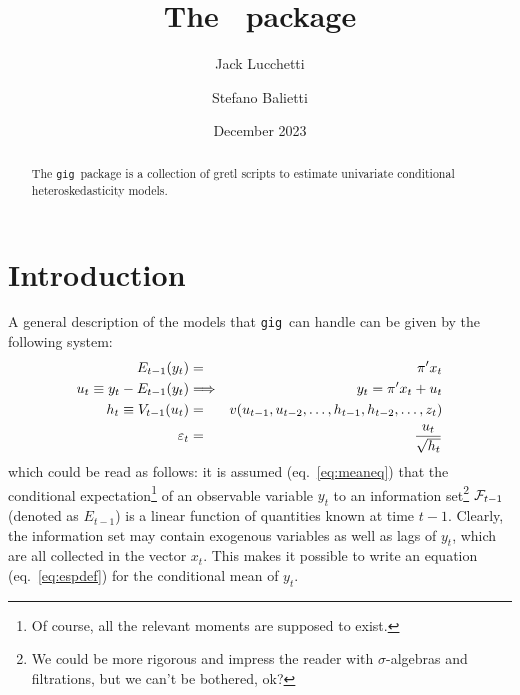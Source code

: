 \documentclass[a4paper,11pt]{article}
\title{The \gig\ package}
\author{Jack Lucchetti \and Stefano Balietti}
\date{December 2023}
\newcommand{\app}[1]{\textsf{#1}}
\newcounter{script}[section]
\newcommand{\stdu}{\ensuremath \varepsilon}
\newcommand{\uhat}{\ensuremath u}
\newcommand{\InfSet}[1]{\ensuremath \mathcal{F}_{#1}}
\newcommand{\gig}{\texttt{gig}}
\begin{document}
\maketitle

\begin{abstract}
The \gig\ package is a collection of \app{gretl} scripts to estimate
univariate conditional heteroskedasticity models. %
\end{abstract}

\tableofcontents

\section{Introduction}

A general description of the models that \gig\ can handle can be given
by the following system:
\begin{eqnarray}
  \label{eq:meaneq}
  E_{t-1}(y_t) & = & \pi'x_t \\
  \label{eq:espdef}
  \uhat_{t} \equiv y_t - E_{t-1}(y_t) & \Longrightarrow &
  y_t = \pi'x_t + \uhat_{t} \\
  \label{eq:vareq}
  h_t \equiv V_{t-1}(\uhat_{t}) & = & 
  v(\uhat_{t-1}, \uhat_{t-2}, \ldots, 
  h_{t-1}, h_{t-2}, \ldots, z_t) \\
  \label{eq:stdinn}
  \stdu_t & = & \frac{\uhat_{t}}{\sqrt{h_t}}
\end{eqnarray}
which could be read as follows: it is assumed (eq.~\ref{eq:meaneq})
that the conditional expectation\footnote{Of course, all the relevant
  moments are supposed to exist.} of an observable variable $y_t$ to an
information set\footnote{We could be more rigorous and impress the
  reader with $\sigma$-algebras and filtrations, but we can't be
  bothered, ok?}  $\InfSet{t-1}$ (denoted as $E_{t-1}$) is a linear
function of quantities known at time $t-1$. Clearly, the information
set may contain exogenous variables as well as lags of $y_t$, which
are all collected in the vector $x_t$. This makes it possible to write
an equation (eq.~\ref{eq:espdef}) for the conditional mean of $y_t$.
\end{document}
